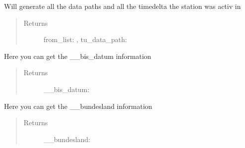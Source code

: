 \documentclass[letterpaper,10pt,english]{sphinxmanual}
\begin{document}
\begin{fulllineitems}
\begin{fulllineitems}
\end{fulllineitems}


\begin{fulllineitems}
\label{\detokenize{DwdDataPrep:DwdDataPrep.Station.generate_tu_date_array}}
\sphinxAtStartPar
{} Will generate all the data paths and all the timedelta the station was activ in
\begin{quote}\begin{description}
\item[{Returns}] \leavevmode
\sphinxAtStartPar
from\_list: , tu\_data\_path: 

\end{description}\end{quote}

\end{fulllineitems}


\begin{fulllineitems}
\label{\detokenize{DwdDataPrep:DwdDataPrep.Station.get_bis_datum}}
\sphinxAtStartPar
{} Here you can get the \_\_bis\_datum information
\begin{quote}\begin{description}
\item[{Returns}] \leavevmode
\sphinxAtStartPar
\_\_bis\_datum: 

\end{description}\end{quote}

\end{fulllineitems}


\begin{fulllineitems}
\label{\detokenize{DwdDataPrep:DwdDataPrep.Station.get_bundesland}}
\sphinxAtStartPar
{} Here you can get the \_\_bundesland information
\begin{quote}\begin{description}
\item[{Returns}] \leavevmode
\sphinxAtStartPar
\_\_bundesland: 


\end{description}
\end{quote}
\end{fulllineitems}
\end{fulllineitems}
\end{document}
